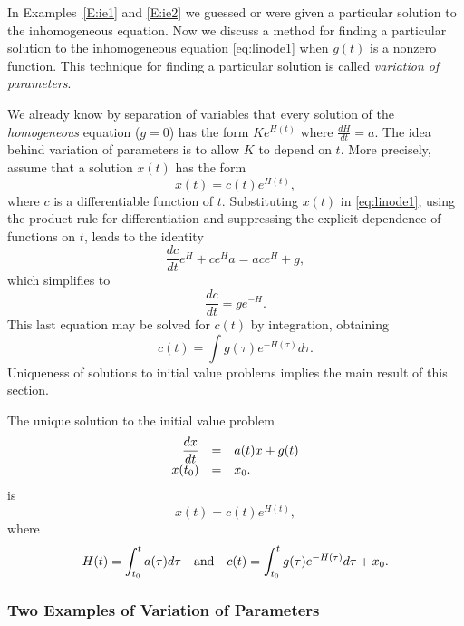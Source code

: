 \documentclass{ximera}
\begin{document}
In Examples~\eqref{E:ie1} and \eqref{E:ie2} we guessed or were given a
particular solution 
to the inhomogeneous equation.  Now we discuss 
a method for finding a particular solution to the inhomogeneous
equation \eqref{eq:linode1} when $g(t)$ is a nonzero function.   This 
technique for finding a particular solution is called 
{\em variation of parameters\/}.  

We already know by separation of variables that every solution of the 
{\em homogeneous\/} equation ($g=0$) has the form $Ke^{H(t)}$ where 
$\frac{dH}{dt}=a$.  The idea behind variation of parameters is to
allow $K$ to depend on $t$.    
More precisely, assume that a solution $x(t)$ has the form
\[
x(t) = c(t)e^{H(t)},
\]
where $c$ is a differentiable function of $t$.  Substituting $x(t)$ in 
\eqref{eq:linode1}, using the product rule for differentiation and suppressing
the explicit dependence of functions on $t$, leads to the identity
\[
\frac{dc}{dt}e^{H}+ce^{H}a =  ace^{H}+g,
\]
which simplifies to
\[
\frac{dc}{dt} = ge^{-H}.
\]
This last equation may be solved for $c(t)$ by integration, obtaining
\begin{equation}   \label{eq:c(t)}
c(t) = \int g(\tau)e^{-H(\tau)}d\tau.
\end{equation}
Uniqueness of solutions to initial 
value problems implies the main result of this section.

\begin{theorem}  \label{thm:varpar}
The unique solution to the initial value problem
\[
\begin{array}{rcl}
\displaystyle \frac{dx}{dt} & = & a(t)x+g(t) \\
x(t_0) & = & x_0.
\end{array}
\]
is
\[
x(t) = c(t)e^{H(t)},
\]
where 
\[
H(t)=\int_{t_0}^t a(\tau)d\tau \quad\mbox{and}\quad
c(t)=\int_{t_0}^t g(\tau)e^{-H(\tau)}d\tau + x_0.
\]
\end{theorem} 


\subsubsection*{Two Examples of Variation of Parameters}
\end{document}
